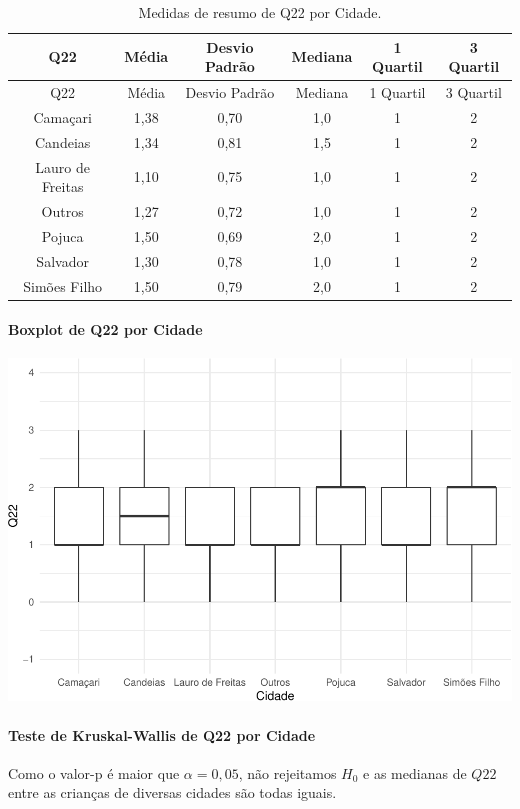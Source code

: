 \documentclass[]{article}
\let\oldparagraph\paragraph
\renewcommand{\paragraph}[1]{\oldparagraph{#1}\mbox{}}
\begin{document}
\begin{longtable}[]{@{}cccccc@{}}
\caption{\label{tab:unnamed-chunk-367}Medidas de resumo de Q22 por Cidade.}\tabularnewline
\toprule
Q22 & Média & Desvio Padrão & Mediana & 1 Quartil & 3 Quartil\tabularnewline
\midrule
\endfirsthead
\toprule
Q22 & Média & Desvio Padrão & Mediana & 1 Quartil & 3 Quartil\tabularnewline
\midrule
\endhead
Camaçari & 1,38 & 0,70 & 1,0 & 1 & 2\tabularnewline
Candeias & 1,34 & 0,81 & 1,5 & 1 & 2\tabularnewline
Lauro de Freitas & 1,10 & 0,75 & 1,0 & 1 & 2\tabularnewline
Outros & 1,27 & 0,72 & 1,0 & 1 & 2\tabularnewline
Pojuca & 1,50 & 0,69 & 2,0 & 1 & 2\tabularnewline
Salvador & 1,30 & 0,78 & 1,0 & 1 & 2\tabularnewline
Simões Filho & 1,50 & 0,79 & 2,0 & 1 & 2\tabularnewline
\bottomrule
\end{longtable}

\hypertarget{boxplot-de-q22-por-cidade}{%
\paragraph{Boxplot de Q22 por Cidade}\label{boxplot-de-q22-por-cidade}}

\begin{center}\includegraphics[width=0.75\linewidth]{relatorio_files/figure-latex/unnamed-chunk-368-1} \end{center}

\hypertarget{teste-de-kruskal-wallis-de-q22-por-cidade}{%
\paragraph{Teste de Kruskal-Wallis de Q22 por Cidade}\label{teste-de-kruskal-wallis-de-q22-por-cidade}}

Como o valor-p é maior que \(\alpha=0,05\), não rejeitamos \(H_0\) e as medianas de \(Q22\) entre as crianças de diversas cidades são todas iguais.
\end{document}
